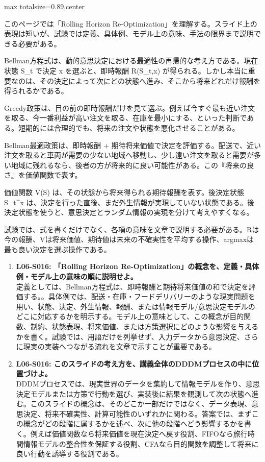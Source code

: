 \begin{minipage}[t]{0.58\textwidth}
\begin{adjustbox}{max totalsize={\textwidth}{0.89\textheight},center}
\begin{minipage}{\textwidth}\scriptsize
{}このページでは「Rolling Horizon Re-Optimization」を理解する。スライド上の表現は短いが、試験では定義、具体例、モデル上の意味、手法の限界まで説明できる必要がある。\par
Bellman方程式は、動的意思決定における最適性の再帰的な考え方である。現在状態 S\_t で決定 x を選ぶと、即時報酬 R(S\_t,x) が得られる。しかし本当に重要なのは、その決定によって次にどの状態へ進み、そこから将来どれだけ報酬を得られるかである。\par
Greedy政策は、目の前の即時報酬だけを見て選ぶ。例えば今すぐ最も近い注文を取る、今一番利益が高い注文を取る、在庫を最小にする、といった判断である。短期的には合理的でも、将来の注文や状態を悪化させることがある。\par
Bellman最適政策は、即時報酬 + 期待将来価値で決定を評価する。配送で、近い注文を取ると車両が需要の少ない地域へ移動し、少し遠い注文を取ると需要が多い地域に残れるなら、後者の方が将来的に良い可能性がある。この『将来の良さ』を価値関数で表す。\par
価値関数 V(S) は、その状態から将来得られる期待報酬を表す。後決定状態 S\_t\textasciicircum{}x は、決定を行った直後、まだ外生情報が実現していない状態である。後決定状態を使うと、意思決定とランダム情報の実現を分けて考えやすくなる。\par
試験では、式を書くだけでなく、各項の意味を文章で説明する必要がある。Rは今の報酬、Vは将来価値、期待値は未来の不確実性を平均する操作、argmaxは最も良い決定を選ぶ操作である。\par{}\begin{enumerate}\item \textbf{L06-S016: 「Rolling Horizon Re-Optimization」の概念を、定義・具体例・モデル上の意味の順に説明せよ。}\\定義としては、Bellman方程式は、即時報酬と期待将来価値の和で決定を評価する。。具体例では、配送・在庫・フードデリバリーのような現実問題を用い、状態、決定、外生情報、報酬、または情報モデル/意思決定モデルのどこに対応するかを明示する。モデル上の意味として、この概念が目的関数、制約、状態表現、将来価値、または方策選択にどのような影響を与えるかを書く。試験では、用語だけを列挙せず、入力データから意思決定、さらに現実の実装へつながる流れを文章で示すことが重要である。\item \textbf{L06-S016: このスライドの考え方を、講義全体のDDDMプロセスの中に位置づけよ。}\\DDDMプロセスでは、現実世界のデータを集約して情報モデルを作り、意思決定モデルまたは方策で行動を選び、実装後に結果を観測して次の状態へ進む。このスライドの概念は、そのどこか一部だけではなく、データ表現、意思決定、将来不確実性、計算可能性のいずれかに関わる。答案では、まずこの概念がどの段階に属するかを述べ、次に他の段階へどう影響するかを書く。例えば価値関数なら将来価値を現在決定へ戻す役割、FIFOなら旅行時間情報モデルの整合性を保証する役割、CFAなら目的関数を調整して将来に良い行動を誘導する役割である。\end{enumerate}

\end{minipage}
\end{adjustbox}
\end{minipage}
